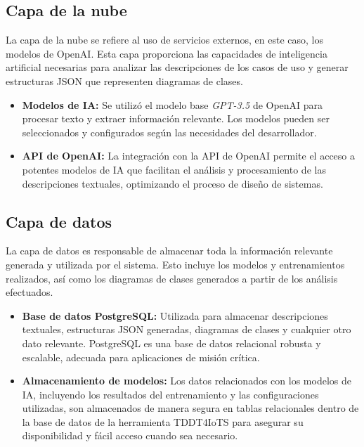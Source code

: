 \subsection{Capa de la nube}

La capa de la nube se refiere al uso de servicios externos, en este caso, los modelos de OpenAI. Esta capa proporciona las capacidades de inteligencia artificial necesarias para analizar las descripciones de los casos de uso y generar estructuras JSON que representen diagramas de clases.

\begin{itemize}
	\item \textbf{Modelos de IA:} Se utilizó el modelo base \textit{GPT-3.5} de OpenAI para procesar texto y extraer información relevante. Los modelos pueden ser seleccionados y configurados según las necesidades del desarrollador.
	\item \textbf{API de OpenAI:} La integración con la API de OpenAI permite el acceso a potentes modelos de IA que facilitan el análisis y procesamiento de las descripciones textuales, optimizando el proceso de diseño de sistemas.
\end{itemize}

\subsection{Capa de datos}

La capa de datos es responsable de almacenar toda la información relevante generada y utilizada por el sistema. Esto incluye los modelos y entrenamientos realizados, así como los diagramas de clases generados a partir de los análisis efectuados.

\begin{itemize}
	\item \textbf{Base de datos PostgreSQL:} Utilizada para almacenar descripciones textuales, estructuras JSON generadas, diagramas de clases y cualquier otro dato relevante. PostgreSQL es una base de datos relacional robusta y escalable, adecuada para aplicaciones de misión crítica.
	\item \textbf{Almacenamiento de modelos:} Los datos relacionados con los modelos de IA, incluyendo los resultados del entrenamiento y las configuraciones utilizadas, son almacenados de manera segura en tablas relacionales dentro de la base de datos de la herramienta TDDT4IoTS para asegurar su disponibilidad y fácil acceso cuando sea necesario.
\end{itemize}

